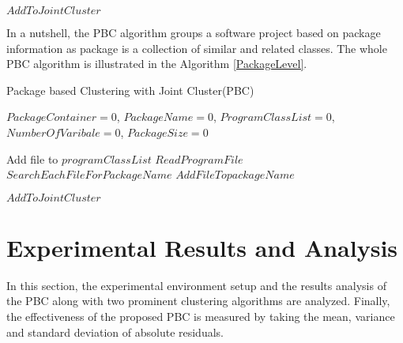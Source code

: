 \documentclass[12pt]{report}
\begin{document}
\begin{algorithm}
\label{PackageLevel}
\begin{algorithmic}[1]
	
			\STATE $Add To Joint Cluster$
		\ENDIF
	\ENDFOR
\end{algorithmic}
\end{algorithm}

In a nutshell, the PBC algorithm groups a software project based on package information as package is a collection of similar and related classes. The whole PBC algorithm is illustrated in the Algorithm \ref{PackageLevel}.

\begin{algorithm}
\caption{Package based Clustering with Joint Cluster(PBC)}
\label{PackageLevel}
\begin{algorithmic}[1]
\REQUIRE $PackageContainer = 0$, $ PackageName = 0$, $ ProgramClassList = 0$, $NumberOfVaribale = 0$, $PackageSize = 0$

				\STATE Add file to $programClassList$
		\ENDIF
	\ENDFOR
{}
			\STATE $Read Program File$ 
			\STATE $Search Each File For PackageName $  
				\STATE $Add File To packageName$
			\ENDIF
	\ENDFOR
	
			\STATE $Add To Joint Cluster$
		\ENDIF
	\ENDFOR
\end{algorithmic}
\end{algorithm}
 

\section{Experimental Results and Analysis }

In this section, the experimental environment setup and the results analysis of the PBC along with two prominent clustering algorithms are analyzed. Finally, the effectiveness of the proposed PBC is measured by taking the mean, variance and standard deviation of absolute residuals. 
\end{document}
